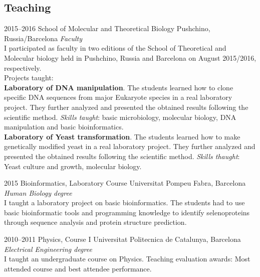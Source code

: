 \documentclass[]{friggeri-cv} %
\begin{document}
\subsection{Teaching}

\begin{entrylist}

\entry
{2015--2016}
{School of Molecular and Theoretical Biology}
{Pushchino, Russia/Barcelona}
{\emph{Faculty}\\
I participated as faculty in two editions of the School of Theoretical
and Molecular biology held in Pushchino, Russia and Barcelona on
August 2015/2016, respectively.\\
Projects taught:\\
{\bf Laboratory of DNA manipulation}. The students learned how to clone specific DNA
sequences from major Eukaryote species in a real laboratory
project. They further analyzed and presented the obtained results
following the scientific method. {\em Skills taught}: basic microbiology,
molecular biology, DNA manipulation and basic bioinformatics. \\
{\bf Laboratory of Yeast transformation}. The students learned how to make genetically
modified yeast in a real laboratory project. They further analyzed and
presented the obtained results following the scientific method. {\em Skills
thaught}: Yeast culture and growth, molecular biology.
}


\entry
{2015}
{Bioinformatics, Laboratory Course}
{Universitat Pompeu Fabra, Barcelona}
{\emph{Human Biology degree} \\
I taught a laboratory project on basic bioinformatics. The students
had to use basic bioinformatic tools and programming knowledge to
identify selenoproteins through sequence analysis and protein
structure prediction.} 


\end{entrylist}
\begin{entrylist}

\entry
{2010--2011}
{Physics, Course I}
{Universitat Politecnica de Catalunya, Barcelona}
{\emph{Electrical Engineering degree} \\
I taught an undergraduate course on Physics. Teaching evaluation
awards: Most attended course and best attendee performance.
}


\end{entrylist}
\end{document}
